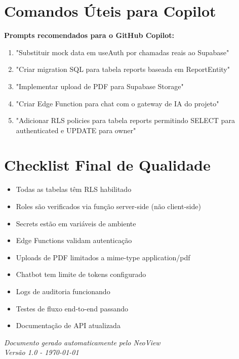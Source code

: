 \documentclass[12pt,a4paper]{article}
\newcommand{\checkbox}{$\square$}
\begin{document}
\section{Comandos Úteis para Copilot}

\begin{tcolorbox}[colback=gray!10!white,colframe=gray!50!black]
\textbf{Prompts recomendados para o GitHub Copilot:}
\end{tcolorbox}

\begin{enumerate}
    \item "Substituir mock data em useAuth por chamadas reais ao Supabase"
    \item "Criar migration SQL para tabela reports baseada em ReportEntity"
    \item "Implementar upload de PDF para Supabase Storage"
    \item "Criar Edge Function para chat com o gateway de IA do projeto"
    \item "Adicionar RLS policies para tabela reports permitindo SELECT para authenticated e UPDATE para owner"
\end{enumerate}

\section{Checklist Final de Qualidade}

\begin{itemize}[label=\checkbox]
    \item Todas as tabelas têm RLS habilitado
    \item Roles são verificados via função server-side (não client-side)
    \item Secrets estão em variáveis de ambiente
    \item Edge Functions validam autenticação
    \item Uploads de PDF limitados a mime-type application/pdf
    \item Chatbot tem limite de tokens configurado
    \item Logs de auditoria funcionando
    \item Testes de fluxo end-to-end passando
    \item Documentação de API atualizada
\end{itemize}

\vspace{1cm}
\begin{center}
\textit{Documento gerado automaticamente pelo NeoView}\\
\textit{Versão 1.0 - \today}
\end{center}
\end{document}
